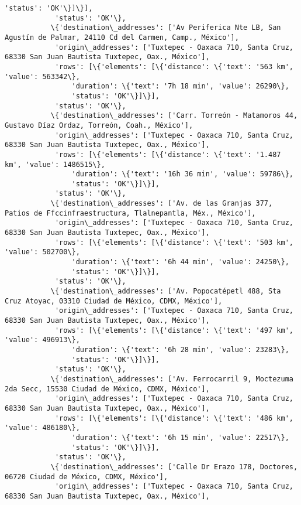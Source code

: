 \documentclass[11pt]{article}
\begin{document}
\begin{Verbatim}[commandchars=\\\{\}]
                'status': 'OK'\}]\}],
            'status': 'OK'\},
           \{'destination\_addresses': ['Av Periferica Nte LB, San Agustín de Palmar, 24110 Cd del Carmen, Camp., México'],
            'origin\_addresses': ['Tuxtepec - Oaxaca 710, Santa Cruz, 68330 San Juan Bautista Tuxtepec, Oax., México'],
            'rows': [\{'elements': [\{'distance': \{'text': '563 km', 'value': 563342\},
                'duration': \{'text': '7h 18 min', 'value': 26290\},
                'status': 'OK'\}]\}],
            'status': 'OK'\},
           \{'destination\_addresses': ['Carr. Torreón - Matamoros 44, Gustavo Díaz Ordaz, Torreón, Coah., México'],
            'origin\_addresses': ['Tuxtepec - Oaxaca 710, Santa Cruz, 68330 San Juan Bautista Tuxtepec, Oax., México'],
            'rows': [\{'elements': [\{'distance': \{'text': '1.487 km', 'value': 1486515\},
                'duration': \{'text': '16h 36 min', 'value': 59786\},
                'status': 'OK'\}]\}],
            'status': 'OK'\},
           \{'destination\_addresses': ['Av. de las Granjas 377, Patios de Ffccinfraestructura, Tlalnepantla, Méx., México'],
            'origin\_addresses': ['Tuxtepec - Oaxaca 710, Santa Cruz, 68330 San Juan Bautista Tuxtepec, Oax., México'],
            'rows': [\{'elements': [\{'distance': \{'text': '503 km', 'value': 502700\},
                'duration': \{'text': '6h 44 min', 'value': 24250\},
                'status': 'OK'\}]\}],
            'status': 'OK'\},
           \{'destination\_addresses': ['Av. Popocatépetl 488, Sta Cruz Atoyac, 03310 Ciudad de México, CDMX, México'],
            'origin\_addresses': ['Tuxtepec - Oaxaca 710, Santa Cruz, 68330 San Juan Bautista Tuxtepec, Oax., México'],
            'rows': [\{'elements': [\{'distance': \{'text': '497 km', 'value': 496913\},
                'duration': \{'text': '6h 28 min', 'value': 23283\},
                'status': 'OK'\}]\}],
            'status': 'OK'\},
           \{'destination\_addresses': ['Av. Ferrocarril 9, Moctezuma 2da Secc, 15530 Ciudad de México, CDMX, México'],
            'origin\_addresses': ['Tuxtepec - Oaxaca 710, Santa Cruz, 68330 San Juan Bautista Tuxtepec, Oax., México'],
            'rows': [\{'elements': [\{'distance': \{'text': '486 km', 'value': 486180\},
                'duration': \{'text': '6h 15 min', 'value': 22517\},
                'status': 'OK'\}]\}],
            'status': 'OK'\},
           \{'destination\_addresses': ['Calle Dr Erazo 178, Doctores, 06720 Ciudad de México, CDMX, México'],
            'origin\_addresses': ['Tuxtepec - Oaxaca 710, Santa Cruz, 68330 San Juan Bautista Tuxtepec, Oax., México'],

\end{Verbatim}
\end{document}

